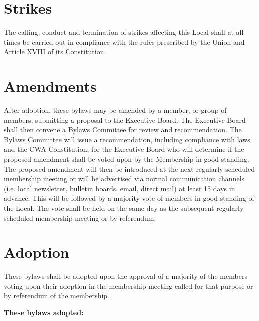 \documentclass[11pt]{article}
\begin{document}
\section{Strikes}
The calling, conduct and termination of strikes affecting this Local shall at all times be carried out in compliance with the rules prescribed by the Union and Article XVIII of its Constitution.

\section{Amendments}\label{amendments}
After adoption, these bylaws may be amended by a member, or group of members, submitting a proposal to the Executive Board. The Executive Board shall then convene a Bylaws Committee for review and recommendation. The Bylaws Committee will issue a recommendation, including compliance with laws and the CWA Constitution, for the Executive Board who will determine if the proposed amendment shall be voted upon by the Membership in good standing. The proposed amendment will then be introduced at the next regularly scheduled membership meeting or will be advertised via normal communication channels (i.e. local newsletter, bulletin boards, email, direct mail) at least 15 days in advance. This will be followed by a majority vote of members in good standing of the Local. The vote shall be held on the same day as the subsequent regularly scheduled membership meeting or by referendum.

\section{Adoption}
These bylaws shall be adopted upon the approval of a majority of the members voting upon their adoption in the membership meeting called for that purpose or by referendum of the membership.

\vspace{1cm}
\large{\textbf{These bylaws adopted:} \date{September 19, 2022}}
\end{document}

